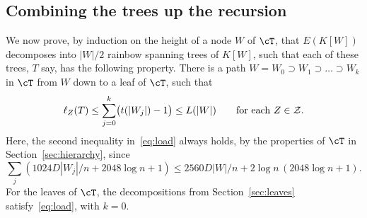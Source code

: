 \subsection{Combining the trees up the recursion}\label{sec:combining}
We now prove, by induction on the height of a node $W$ of $\cT$, that $E(K[W])$ decomposes into $|W|/2$ rainbow spanning trees of $K[W]$, such that each of these trees, $T$ say, has the following property. There is a path $W=W_0\supset W_1\supset\dots\supset W_k$ in $\cT$ from $W$ down to a leaf of $\cT$, such that
\begin{equation}\label{eq:load}
\ell_Z(T)\le\sum_{j=0}^k\bigl(t(|W_j|)-1\bigr)\le L(|W|)\qquad\text{for each } Z\in\mathcal{Z}.
\end{equation}
Here, the second inequality in~\eqref{eq:load} always holds, by the properties of $\cT$ in Section~\ref{sec:hierarchy}, since
\[\textstyle\sum_j(1024D|W_j|/n+2048\log n+1)\le2560D|W|/n+2\log n\,(2048\log n+1).\]
For the leaves of $\cT$, the decompositions from Section~\ref{sec:leaves} satisfy~\eqref{eq:load}, with $k=0$.

